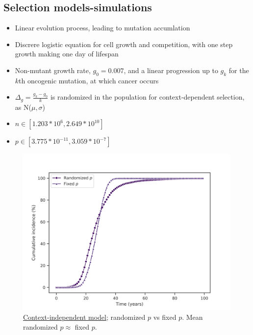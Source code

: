\documentclass[a0,landscape]{a0poster}
\begin{document}
\begin{multicols}{3}
		\section{Selection models-simulations}
		\begin{minipage}{.5\linewidth}
		\begin{itemize}
			\item Linear evolution process, leading to mutation accumlation
			\item Discrere logistic equation for cell growth and competition, with one step growth making one day of lifespan
			\item Non-mutant growth rate, $g_{0}=0.007$, and a linear progression up to $g_{k}$ for the $k$th oncogenic mutation, at which cancer occurs
			\item $\Delta_{g}=\frac{g_{k}-g_{0}}{k}$ is randomized in the population for context-dependent selection, as N($\mu, \sigma$)
			\item $n \in [1.203*10^{6}, 2.649*10^{10}]$
			\item $p \in [3.775*10^{-11}, 3.059*10^{-7}]$
		\end{itemize}
		\end{minipage}
		\hspace{0.05\linewidth}
		\begin{minipage}{.4\linewidth}
			\begin{figure}[H]
				\includegraphics[width=\linewidth]{fig4.png}
				\caption{\underline{Context-independent model}; randomized $p$ vs fixed $p$. Mean randomized $p \approx$ fixed $p$.}
			\end{figure}
		\end{minipage}

\end{multicols}
\end{document}
